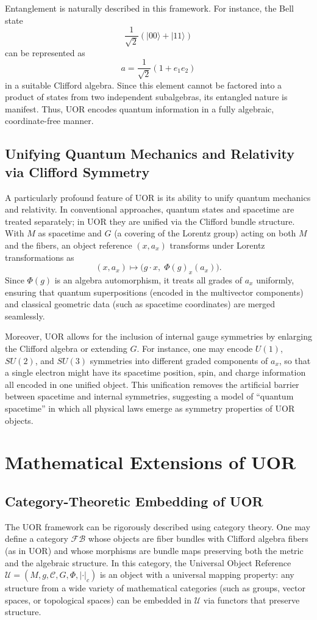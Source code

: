 \documentclass[12pt]{article}
\begin{document}
Entanglement is naturally described in this framework. For instance, the Bell state 
\[
\frac{1}{\sqrt{2}} \left( |00\rangle + |11\rangle \right)
\]
can be represented as 
\[
a = \frac{1}{\sqrt{2}} (1 + e_1e_2)
\]
in a suitable Clifford algebra. Since this element cannot be factored into a product of states from two independent subalgebras, its entangled nature is manifest. Thus, UOR encodes quantum information in a fully algebraic, coordinate-free manner.

\subsection{Unifying Quantum Mechanics and Relativity via Clifford Symmetry}
A particularly profound feature of UOR is its ability to unify quantum mechanics and relativity. In conventional approaches, quantum states and spacetime are treated separately; in UOR they are unified via the Clifford bundle structure. With $M$ as spacetime and $G$ (a covering of the Lorentz group) acting on both $M$ and the fibers, an object reference $(x,a_x)$ transforms under Lorentz transformations as 
\[
(x,a_x) \mapsto \bigl( g\cdot x,\; \Phi(g)_x(a_x) \bigr).
\]
Since $\Phi(g)$ is an algebra automorphism, it treats all grades of $a_x$ uniformly, ensuring that quantum superpositions (encoded in the multivector components) and classical geometric data (such as spacetime coordinates) are merged seamlessly. 

Moreover, UOR allows for the inclusion of internal gauge symmetries by enlarging the Clifford algebra or extending $G$. For instance, one may encode $U(1)$, $SU(2)$, and $SU(3)$ symmetries into different graded components of $a_x$, so that a single electron might have its spacetime position, spin, and charge information all encoded in one unified object. This unification removes the artificial barrier between spacetime and internal symmetries, suggesting a model of ``quantum spacetime'' in which all physical laws emerge as symmetry properties of UOR objects.

\section{Mathematical Extensions of UOR}

\subsection{Category-Theoretic Embedding of UOR}
The UOR framework can be rigorously described using category theory. One may define a category $\mathcal{FB}$ whose objects are fiber bundles with Clifford algebra fibers (as in UOR) and whose morphisms are bundle maps preserving both the metric and the algebraic structure. In this category, the Universal Object Reference $\mathcal{U}=(M,g,\mathcal{C},G,\Phi,|\cdot|_c)$ is an object with a universal mapping property: any structure from a wide variety of mathematical categories (such as groups, vector spaces, or topological spaces) can be embedded in $\mathcal{U}$ via functors that preserve structure.
\end{document}
